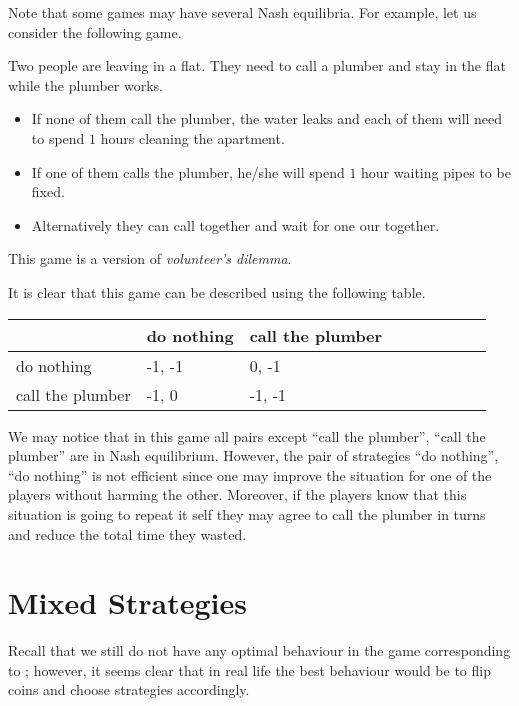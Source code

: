 Note that some games may have several Nash equilibria. For example, let us
consider the following game.
\begin{game}
  Two people are leaving in a flat. They need to call a plumber and stay in the
  flat while the plumber works.
  \begin{itemize}
    \item If none of them call the plumber, the water leaks and each of them
      will need to spend $1$ hours cleaning the apartment.
    \item If one of them calls the plumber, he/she will spend $1$ hour waiting
      pipes to be fixed.
    \item Alternatively they can call together and wait for one our together.
  \end{itemize}
  This game is a version of \emph{volunteer's dilemma}.
\end{game}
It is clear that this game can be described using the following table.
\begin{center}
  \begin{tabular}{l l l  l  l  l  l  l  l}
    \toprule
                       & do nothing  & call the plumber   \\
    \midrule
    do nothing         & -1, -1    & 0, -1    \\
    call the plumber   & -1, 0       & -1, -1   \\
    \bottomrule
  \end{tabular}
\end{center}
We may notice that in this game all pairs except ``call the plumber'', ``call the
plumber'' are in Nash equilibrium. However, the pair of strategies ``do
nothing'', ``do nothing'' is not efficient since one may improve the situation
for one of the players without harming the other. Moreover, if the players know
that this situation is going to repeat it self they may agree to call the
plumber in turns and reduce the total time they wasted. 

\section{Mixed Strategies}
Recall that we still do not have any optimal behaviour in the game corresponding
to ; however, it seems clear that in real life
the best behaviour would be to flip coins and choose strategies accordingly.


